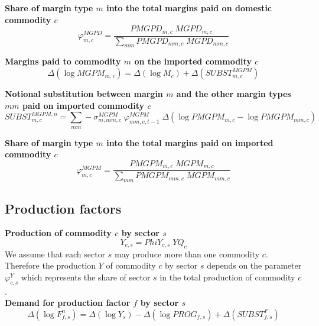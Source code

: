 \documentclass[12pt]{article}
\numberwithin{equation}{section}
\begin{document}
\noindent \textbf{Share of margin type $m$ into the total margins paid on domestic commodity $c$} 
\begin{dmath}
\varphi^{MGPD}_{m, c} = \frac{PMGPD_{m, c} \; MGPD_{m, c}}{\sum_{mm} PMGPD_{mm, c} \; MGPD_{mm, c}}
\label{producer.mdlphi_MGPD[m, c]}
\end{dmath}

\noindent \textbf{Margins paid to commodity $m$ on the imported commodity $c$} 
\begin{dmath}
\varDelta \left(\operatorname{log} MGPM_{m, c}\right) = \varDelta \left(\operatorname{log} M_{c}\right) + \varDelta \left(SUBST^{MGPM}_{m, c}\right)
\label{producer.mdlMGPM[m, c]}
\end{dmath}

\noindent \textbf{Notional substitution between margin $m$ and the other margin types $mm$ paid on imported commodity $c$} 
\begin{dmath}
SUBST^{MGPM,n}_{m, c} = \sum_{mm} -\sigma^{MGPM}_{m, mm, c} \; \varphi^{MGPM}_{mm, c, t-1} \; \varDelta \left(\operatorname{log} PMGPM_{m, c} - \operatorname{log} PMGPM_{mm, c}\right)
\label{producer.mdlSUBST_MGPM_n[m, c]}
\end{dmath}

\noindent \textbf{Share of margin type $m$ into the total margins paid on imported commodity $c$} 
\begin{dmath}
\varphi^{MGPM}_{m, c} = \frac{PMGPM_{m, c} \; MGPM_{m, c}}{\sum_{mm} PMGPM_{mm, c} \; MGPM_{mm, c}}
\label{producer.mdlphi_MGPM[m, c]}
\end{dmath}



\subsection{Production factors}



\noindent \textbf{Production of commodity $c$ by sector $s$} 
\begin{dmath}
Y_{c, s} = PhiY_{c, s} \; YQ_{c}
\label{producer.mdlY[c, s]}
\end{dmath}
We assume that each sector $s$ may produce more than one commodity $c$. Therefore the production $Y$ of commodity $c$ by sector $s$ depends on the parameter $\varphi^{Y}_{c, s}$ which represents the share of sector $s$ in the total production of commodity $c$. \\

\noindent \textbf{Demand for production factor $f$ by sector $s$} 
\begin{dmath}
\varDelta \left(\operatorname{log} F^{n}_{f, s}\right) = \varDelta \left(\operatorname{log} Y_{s}\right) - \varDelta \left(\operatorname{log} PROG_{f, s}\right) + \varDelta \left(SUBST^{F}_{f, s}\right)
\label{producer.mdlF_n[f, s]}
\end{dmath}
\end{document}
